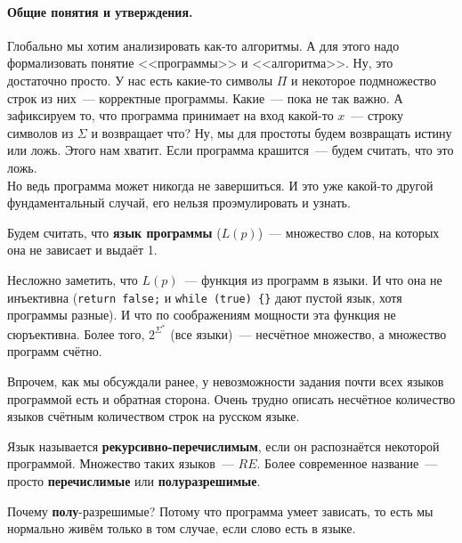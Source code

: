 \documentclass{article}
\begin{document}
    \paragraph{Общие понятия и утверждения.}
    \begin{remark}
        Глобально мы хотим анализировать как-то алгоритмы. А для этого надо формализовать понятие <<программы>> и <<алгоритма>>. Ну, это достаточно просто. У нас есть какие-то символы $\Pi$ и некоторое подмножество строк из них~--- корректные программы. Какие~--- пока не так важно. А зафиксируем то, что программа принимает на вход какой-то $x$~--- строку символов из $\Sigma$ и возвращает что? Ну, мы для простоты будем возвращать истину или ложь. Этого нам хватит. Если программа крашится~--- будем считать, что это ложь.\\
        Но ведь программа может никогда не завершиться. И это уже какой-то другой фундаментальный случай, его нельзя проэмулировать и узнать.
    \end{remark}
    \begin{definition}
        Будем считать, что \textbf{язык программы} ($L(p)$)~--- множество слов, на которых она не зависает и выдаёт 1.
    \end{definition}
    \begin{claim}
        Несложно заметить, что $L(p)$~--- функция из программ в языки. И что она не инъективна (\Verb|return false;| и \Verb|while (true) {}| дают пустой язык, хотя программы разные). И что по соображениям мощности эта функция не сюръективна. Более того, $2^{\Sigma^*}$ (все языки)~--- несчётное множество, а множество программ счётно.
    \end{claim}
    \begin{remark}
        Впрочем, как мы обсуждали ранее, у невозможности задания почти всех языков программой есть и обратная сторона. Очень трудно описать несчётное количество языков счётным количеством строк на русском языке.
    \end{remark}
    \begin{definition}
        Язык называется \textbf{рекурсивно-перечислимым}, если он распознаётся некоторой программой. Множество таких языков~--- $RE$. Более современное название~--- просто \textbf{перечислимые} или \textbf{полуразрешимые}.
    \end{definition}
    \begin{remark}
        Почему \textbf{полу}-разрешимые? Потому что программа умеет зависать, то есть мы нормально живём только в том случае, если слово есть в языке.
    \end{remark}
\end{document}

